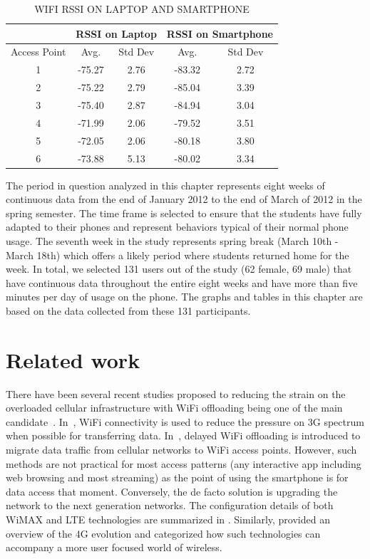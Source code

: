 \begin{table}[h!tbp] 
\caption{WIFI RSSI ON LAPTOP AND SMARTPHONE} 
\label{table:diff_rssi}
\centering 
\begin{tabular}{|c|c|c|c|c|}
\hline
& \multicolumn{2}{c|}{RSSI on Laptop} & \multicolumn{2}{c|}{RSSI on Smartphone} \\
\hline Access Point & Avg. & Std Dev & Avg. & Std Dev \\
\hline 1 & -75.27 & 2.76 & -83.32 & 2.72  \\ 
\hline 2 & -75.22 & 2.79 & -85.04 & 3.39 \\
\hline 3 & -75.40 & 2.87 & -84.94 & 3.04\\
\hline 4 & -71.99 & 2.06 & -79.52 & 3.51\\
\hline 5 & -72.05 & 2.06 & -80.18 & 3.80\\
\hline 6 & -73.88 & 5.13 & -80.02 & 3.34\\
\hline
\end{tabular}
\end{table}

The period in question analyzed in
this chapter represents eight weeks of continuous data from the end of January 2012 to the end of March of 2012 in the spring semester. The time frame is selected to ensure that the students have fully adapted to 
their phones and represent behaviors typical of their normal phone usage.  The seventh week in the study 
represents spring break (March 10th - March 18th) which offers a likely period where students returned home
for the week. In total, we selected 131 users out of the study (62 female, 69 male) that have continuous data throughout the
entire eight weeks and have more than five minutes per day of usage on the phone. The graphs and tables in this chapter are based on the data collected from these 131 participants. 

\section{Related work}\label{related}
There have been several recent studies proposed to reducing the strain on the overloaded cellular infrastructure with WiFi offloading being one of the main candidate~\cite{balasubramanian2010augmenting,lee2010mobile,dimatteo2011cellular,icc2012performance,han2011mobile}. In~\cite{balasubramanian2010augmenting}, WiFi connectivity is used to reduce the pressure on 3G spectrum when possible for transferring data. In~\cite{lee2010mobile,dimatteo2011cellular,icc2012performance,han2011mobile}, delayed WiFi offloading is introduced to migrate data traffic from cellular networks to WiFi access points. However, such methods are not practical for most access patterns (any interactive app including web browsing and most streaming) as the point of using the smartphone is for data access that moment. Conversely, the de facto solution is upgrading the network to the next generation networks. The configuration details of both WiMAX and LTE technologies are summarized in \cite{khan20094g}. Similarly, \cite{arshad2010evolution} provided an overview of the 4G evolution and categorized how such technologies can accompany a more user focused world of wireless. 

